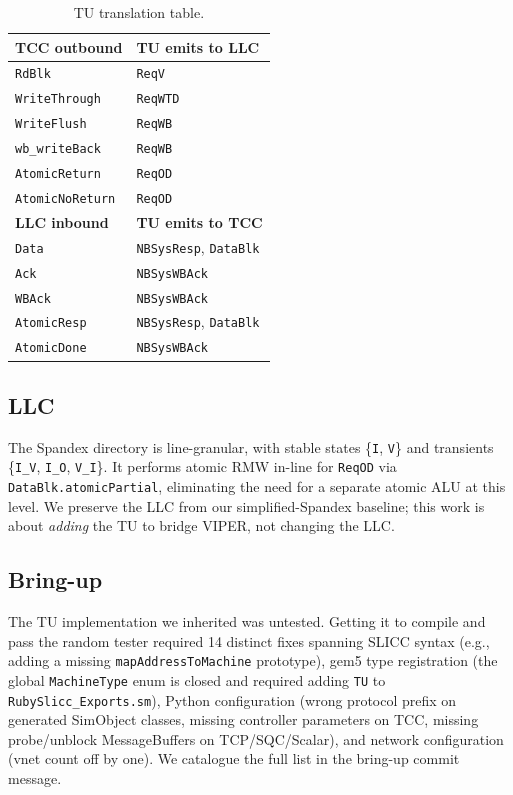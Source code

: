 \documentclass[conference,letterpaper,10pt]{IEEEtran}
\begin{document}
\begin{table}[t]
\centering
\caption{TU translation table.}
\label{tab:translation}
\small
\begin{tabular}{ll}
\toprule
\textbf{TCC outbound} & \textbf{TU emits to LLC} \\
\midrule
\texttt{RdBlk}            & \texttt{ReqV}   \\
\texttt{WriteThrough}     & \texttt{ReqWTD} \\
\texttt{WriteFlush}       & \texttt{ReqWB}  \\
\texttt{wb\_writeBack}    & \texttt{ReqWB}  \\
\texttt{AtomicReturn}     & \texttt{ReqOD}  \\
\texttt{AtomicNoReturn}   & \texttt{ReqOD}  \\
\midrule
\textbf{LLC inbound}      & \textbf{TU emits to TCC} \\
\midrule
\texttt{Data}             & \texttt{NBSysResp}, \texttt{DataBlk} \\
\texttt{Ack}              & \texttt{NBSysWBAck}                  \\
\texttt{WBAck}            & \texttt{NBSysWBAck}                  \\
\texttt{AtomicResp}       & \texttt{NBSysResp}, \texttt{DataBlk} \\
\texttt{AtomicDone}       & \texttt{NBSysWBAck}                  \\
\bottomrule
\end{tabular}
\end{table}

\subsection{LLC}
The Spandex directory is line-granular, with stable states
\{\texttt{I}, \texttt{V}\} and transients
\{\texttt{I\_V}, \texttt{I\_O}, \texttt{V\_I}\}. It performs atomic RMW
in-line for \texttt{ReqOD} via \texttt{DataBlk.atomicPartial},
eliminating the need for a separate atomic ALU at this level. We
preserve the LLC from our simplified-Spandex baseline; this work is
about \emph{adding} the TU to bridge VIPER, not changing the LLC.

\subsection{Bring-up}
The TU implementation we inherited was untested. Getting it to compile
and pass the random tester required 14 distinct fixes spanning SLICC
syntax (e.g., adding a missing \texttt{mapAddressToMachine} prototype),
gem5 type registration (the global \texttt{MachineType} enum is closed
and required adding \texttt{TU} to
\texttt{RubySlicc\_Exports.sm}), Python configuration (wrong protocol
prefix on generated SimObject classes, missing controller parameters
on TCC, missing probe/unblock MessageBuffers on TCP/SQC/Scalar), and
network configuration (vnet count off by one). We catalogue the full
list in the bring-up commit message.
\end{document}
